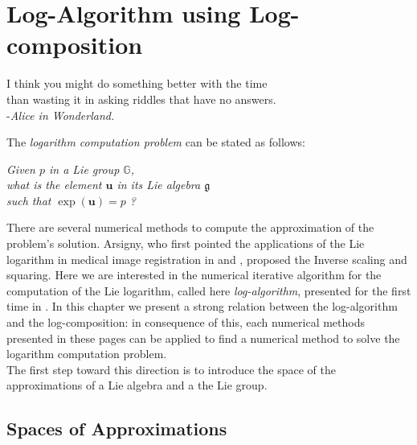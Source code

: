\chapter{Log-Algorithm using Log-composition}\label{ch:log_algorithm}

\begin{flushright}
	I think you might do something better with the time \\ than wasting it in asking riddles that have no answers. \\ -\emph{Alice in Wonderland.}
\end{flushright}

\vspace{0.5 cm}

\noindent
The \emph{logarithm computation problem} can be stated as follows:
\begin{center}
\emph{
	Given $p$ in a Lie group $\mathbb{G}$, \\ 
	what is the element $\mathbf{u}$ in its Lie algebra $\mathfrak{g}$ \\
	such that $\exp(\mathbf{u}) = p$ ?  
}
\end{center}
There are several numerical methods to compute the approximation of the problem's solution. Arsigny, who first pointed the applications of the Lie logarithm in medical image registration in\cite{Arsigny:MRM:06} and \cite{arsigny2006bi}, proposed the Inverse scaling and squaring. Here we are interested in the numerical iterative algorithm for the computation of the Lie logarithm, called here \emph{log-algorithm}, presented for the first time in \cite{Bossa:08}. In this chapter we present a strong relation between the log-algorithm and the log-composition: in consequence of this, each numerical methods presented in these pages can be applied to find a numerical method to solve the logarithm computation problem.\\
The first step toward this direction is to introduce the space of the approximations of a Lie algebra and a the Lie group.


\section{Spaces of Approximations}\label{se:space_of_approximation}

